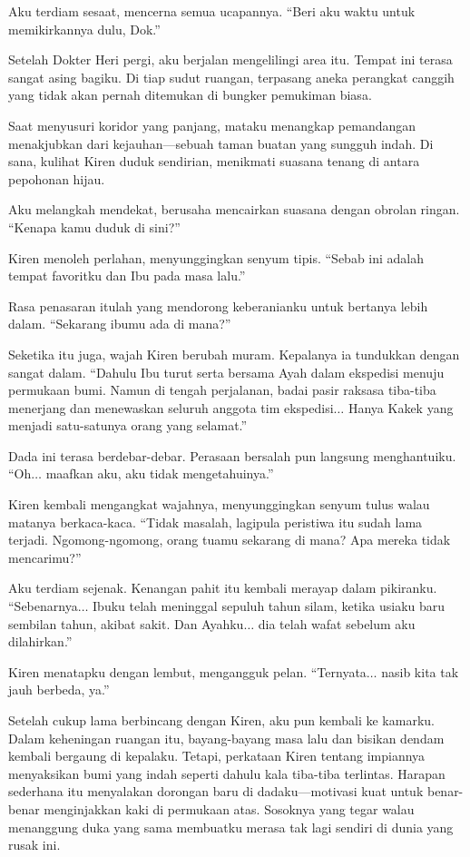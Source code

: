 Aku terdiam sesaat, mencerna semua ucapannya. ``Beri aku waktu untuk memikirkannya dulu, Dok.''

Setelah Dokter Heri pergi, aku berjalan mengelilingi area itu. Tempat ini terasa sangat asing bagiku. Di tiap sudut ruangan, terpasang aneka perangkat canggih yang tidak akan pernah ditemukan di bungker pemukiman biasa.

Saat menyusuri koridor yang panjang, mataku menangkap pemandangan menakjubkan dari kejauhan—sebuah taman buatan yang sungguh indah. Di sana, kulihat Kiren duduk sendirian, menikmati suasana tenang di antara pepohonan hijau.

Aku melangkah mendekat, berusaha mencairkan suasana dengan obrolan ringan. ``Kenapa kamu duduk di sini?''

Kiren menoleh perlahan, menyunggingkan senyum tipis. ``Sebab ini adalah tempat favoritku dan Ibu pada masa lalu.''

Rasa penasaran itulah yang mendorong keberanianku untuk bertanya lebih dalam. ``Sekarang ibumu ada di mana?''

Seketika itu juga, wajah Kiren berubah muram. Kepalanya ia tundukkan dengan sangat dalam. ``Dahulu Ibu turut serta bersama Ayah dalam ekspedisi menuju permukaan bumi. Namun di tengah perjalanan, badai pasir raksasa tiba-tiba menerjang dan menewaskan seluruh anggota tim ekspedisi$\dots$ Hanya Kakek yang menjadi satu-satunya orang yang selamat.''

Dada ini terasa berdebar-debar. Perasaan bersalah pun langsung menghantuiku. ``Oh$\dots$ maafkan aku, aku tidak mengetahuinya.''

Kiren kembali mengangkat wajahnya, menyunggingkan senyum tulus walau matanya berkaca-kaca. ``Tidak masalah, lagipula peristiwa itu sudah lama terjadi. Ngomong-ngomong, orang tuamu sekarang di mana? Apa mereka tidak mencarimu?''

Aku terdiam sejenak. Kenangan pahit itu kembali merayap dalam pikiranku. ``Sebenarnya$\dots$ Ibuku telah meninggal sepuluh tahun silam, ketika usiaku baru sembilan tahun, akibat sakit. Dan Ayahku$\dots$ dia telah wafat sebelum aku dilahirkan.''

Kiren menatapku dengan lembut, mengangguk pelan. ``Ternyata$\dots$ nasib kita tak jauh berbeda, ya.''

Setelah cukup lama berbincang dengan Kiren, aku pun kembali ke kamarku. Dalam keheningan ruangan itu, bayang-bayang masa lalu dan bisikan dendam kembali bergaung di kepalaku. Tetapi, perkataan Kiren tentang impiannya menyaksikan bumi yang indah seperti dahulu kala tiba-tiba terlintas. Harapan sederhana itu menyalakan dorongan baru di dadaku—motivasi kuat untuk benar-benar menginjakkan kaki di permukaan atas. Sosoknya yang tegar walau menanggung duka yang sama membuatku merasa tak lagi sendiri di dunia yang rusak ini.

